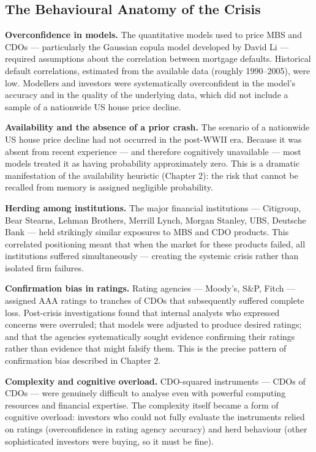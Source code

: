 \documentclass[12pt, letterpaper]{article}
\begin{document}
\subsection{The Behavioural Anatomy of the Crisis}


\textbf{Overconfidence in models.} The quantitative models used to price MBS and CDOs --- particularly the Gaussian copula model developed by David Li --- required assumptions about the correlation between mortgage defaults. Historical default correlations, estimated from the available data (roughly 1990--2005), were low. Modellers and investors were systematically overconfident in the model's accuracy and in the quality of the underlying data, which did not include a sample of a nationwide US house price decline.

\textbf{Availability and the absence of a prior crash.} The scenario of a nationwide US house price decline had not occurred in the post-WWII era. Because it was absent from recent experience --- and therefore cognitively unavailable --- most models treated it as having probability approximately zero. This is a dramatic manifestation of the availability heuristic (Chapter 2): the risk that cannot be recalled from memory is assigned negligible probability.

\textbf{Herding among institutions.} The major financial institutions --- Citigroup, Bear Stearns, Lehman Brothers, Merrill Lynch, Morgan Stanley, UBS, Deutsche Bank --- held strikingly similar exposures to MBS and CDO products. This correlated positioning meant that when the market for these products failed, all institutions suffered simultaneously --- creating the systemic crisis rather than isolated firm failures.

\textbf{Confirmation bias in ratings.} Rating agencies --- Moody's, S\&P, Fitch --- assigned AAA ratings to tranches of CDOs that subsequently suffered complete loss. Post-crisis investigations found that internal analysts who expressed concerns were overruled; that models were adjusted to produce desired ratings; and that the agencies systematically sought evidence confirming their ratings rather than evidence that might falsify them. This is the precise pattern of confirmation bias described in Chapter 2.

\textbf{Complexity and cognitive overload.} CDO-squared instruments --- CDOs of CDOs --- were genuinely difficult to analyse even with powerful computing resources and financial expertise. The complexity itself became a form of cognitive overload: investors who could not fully evaluate the instruments relied on ratings (overconfidence in rating agency accuracy) and herd behaviour (other sophisticated investors were buying, so it must be fine).
\end{document}
